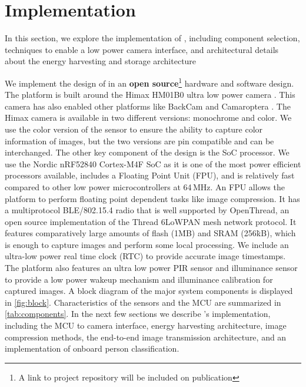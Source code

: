 
\section{Implementation}

In this section, we explore the implementation of \name{}, including component selection, techniques to enable a low power camera interface, and architectural details about the energy harvesting and storage architecture

We implement the design of \name{} in an \textbf{open source}\footnote{A link to project repository will be included on publication} hardware and software design. The platform is built around the Himax HM01B0 ultra low power camera \cite{hm01b0}. This camera has also enabled other platforms like BackCam \cite{josephson2019wireless} and Camaroptera \cite{nardello2019camaroptera}. The Himax camera is available in two different versions: monochrome and color. We use the color version of the sensor to ensure the ability to capture color information of images, but the two versions are pin compatible and can be interchanged. The other key component of the design is the SoC processor. We use the Nordic nRF52840 Cortex-M4F SoC as it is one of the most power efficient processors available, includes a Floating Point Unit (FPU), and is relatively fast compared to other low power microcontrollers at 64\,MHz. An FPU allows the platform to perform floating point dependent tasks like image compression. It has a multiprotocol BLE/802.15.4 radio that is well supported by OpenThread, an open source implementation of the Thread 6LoWPAN mesh network protocol. It features comparatively large amounts of flash (1\.MB) and SRAM (256\.kB), which is enough to capture images and perform some local processing. We include an ultra-low power real time clock (RTC) to provide accurate image timestamps. The platform also features an ultra low power PIR sensor and illuminance sensor to provide a low power wakeup mechanism and illuminance calibration for captured images. A block diagram of the major system components is displayed in \cref{fig:block}. Characteristics of the sensors and the MCU are summarized in \cref{tab:components}. In the next few sections we describe \name{}'s implementation, including the MCU to camera interface, energy harvesting architecture, image compression methods, the end-to-end image transmission architecture, and an implementation of onboard person classification.

